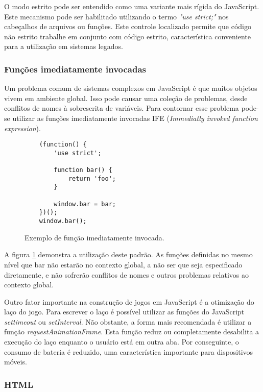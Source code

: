 O modo estrito pode ser entendido como uma variante mais rígida do
JavaScript. Este mecanismo pode ser habilitado utilizando o termo
\textit{"use strict;"} nos cabeçalhos de arquivos ou funções.
Este controle localizado permite que código não estrito trabalhe
em conjunto com código estrito, característica conveniente para a
utilização em sistemas legados.

\subsubsection{Funções imediatamente invocadas}

Um problema comum de sistemas complexos em JavaScript é que muitos
objetos vivem em ambiente global. Isso pode causar uma coleção de
problemas, desde conflitos de nomes à sobrescrita de variáveis. Para
contornar esse problema pode-se utilizar as funções imediatamente
invocadas IFE (\textit{Immediatly invoked function expression}).

\begin{figure}[H]
\centering
\begin{verbatim}
    (function() {
        'use strict';

        function bar() {
            return 'foo';
        }

        window.bar = bar;
    })();
    window.bar();
\end{verbatim}
\caption{Exemplo de função imediatamente invocada.}
\label{fig:iife}
\end{figure}

A figura \ref{fig:iife} demonstra a utilização deste padrão. As
funções definidas no mesmo nível que bar não estarão no contexto
global, a não ser que seja especificado diretamente, e não sofrerão
conflitos de nomes e outros problemas relativos ao contexto global.

Outro fator importante na construção de jogos em JavaScript é a
otimização do laço do jogo. Para escrever o laço é possível
utilizar as funções do JavaScript \textit{settimeout} ou
\textit{setInterval}. Não obstante, a forma mais recomendada é
utilizar a função \textit{requestAnimationFrame}. Esta função reduz
ou completamente desabilita a execução do laço enquanto o usuário está
em outra aba. Por conseguinte, o consumo de bateria é reduzido, uma
característica importante para dispositivos móveis.

\subsubsection{HTML}


